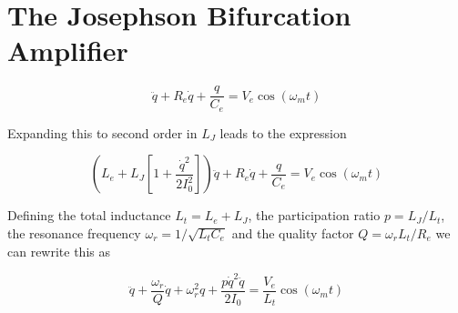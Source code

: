 \section{The Josephson Bifurcation Amplifier}

\citep{palacios-laloy_superconducting_2010}

\begin{equation}
[L_e+L_J (i)]\ddot{q}+R_e \dot{q}+\frac{q}{C_e} = V_e \cos{\left(\omega_m t\right)}
\end{equation}

Expanding this to second order in $L_J$ leads to the expression

\begin{equation}
\left(L_e+L_J\left[1+\frac{\dot{q}^2}{2 I_0^2}\right]\right)\ddot{q}+R_e \dot{q}+\frac{q}{C_e} = V_e \cos{\left( \omega_m t\right)}
\end{equation}

Defining the total inductance $L_t = L_e+L_J$, the participation ratio $p=L_J/L_t$, the resonance frequency $\omega_r = 1/\sqrt{L_t C_e}$ and the quality factor $Q = \omega_r L_t / R_e$ we can rewrite this as

\begin{equation}
\ddot{q}+\frac{\omega_r}{Q}\dot{q}+\omega_r^2 q + \frac{p \dot{q}^2 \ddot{q}}{2 I_0} = \frac{V_e}{L_t}\cos{\left(\omega_m t \right)}
\end{equation}
